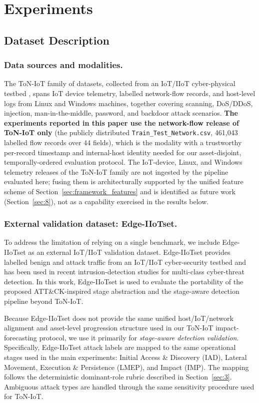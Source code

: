 \documentclass[pdflatex,sn-mathphys-num]{sn-jnl}
\theoremstyle{thmstyleone}%
\theoremstyle{thmstyletwo}%
\theoremstyle{thmstylethree}%
\begin{document}
\section{Experiments}
\label{sec:5}

\subsection{Dataset Description}
\label{subsec:dataset_description}

\subsubsection{Data sources and modalities.}
The ToN-IoT family of datasets, collected from an IoT/IIoT cyber-physical testbed \cite{alsaedi2020toniot,moustafa2020tonlinux,moustafa2020tonwindows}, spans IoT device telemetry, labelled network-flow records, and host-level logs from Linux and Windows machines, together covering scanning, DoS/DDoS, injection, man-in-the-middle, password, and backdoor attack scenarios. \textbf{The experiments reported in this paper use the network-flow release of ToN-IoT only} (the publicly distributed \texttt{Train\_Test\_Network.csv}, 461{,}043 labelled flow records over 44 fields), which is the modality with a trustworthy per-record timestamp and internal-host identity needed for our asset-disjoint, temporally-ordered evaluation protocol. The IoT-device, Linux, and Windows telemetry releases of the ToN-IoT family are not ingested by the pipeline evaluated here; fusing them is architecturally supported by the unified feature scheme of Section~\ref{sec:framework_features} and is identified as future work (Section~\ref{sec:8}), not as a capability exercised in the results below.

\color{red}
\subsubsection{External validation dataset: Edge-IIoTset.}
To address the limitation of relying on a single benchmark, we include Edge-IIoTset as an external IoT/IIoT validation dataset. Edge-IIoTset provides labelled benign and attack traffic from an IoT/IIoT cyber-security testbed and has been used in recent intrusion-detection studies for multi-class cyber-threat detection. In this work, Edge-IIoTset is used to evaluate the portability of the proposed ATT\&CK-inspired stage abstraction and the stage-aware detection pipeline beyond ToN-IoT.

Because Edge-IIoTset does not provide the same unified host/IoT/network alignment and asset-level progression structure used in our ToN-IoT impact-forecasting protocol, we use it primarily for \emph{stage-aware detection validation}. Specifically, Edge-IIoTset attack labels are mapped to the same operational stages used in the main experiments: Initial Access \& Discovery (IAD), Lateral Movement, Execution \& Persistence (LMEP), and Impact (IMP). The mapping follows the deterministic dominant-role rubric described in Section~\ref{sec:3}. Ambiguous attack types are handled through the same sensitivity procedure used for ToN-IoT.
\end{document}
